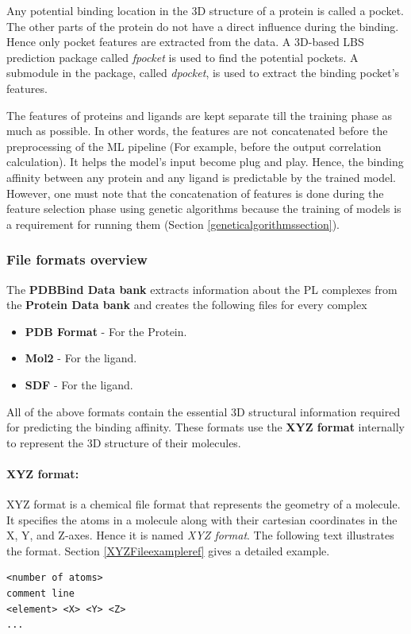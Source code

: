 \documentclass[11pt]{article}
\begin{document}
Any potential binding location in the 3D structure of a protein is called a pocket. The other parts of the protein do not have a direct influence during the binding. Hence only pocket features are extracted from the data.
A 3D-based LBS prediction package called \textit{fpocket} is used to find the potential pockets.
A submodule in the package, called \textit{dpocket}, is used to extract the binding pocket's features.

The features of proteins and ligands are kept separate till the training phase as much as possible.
In other words, the features are not concatenated before the preprocessing of the ML pipeline (For example, before the output correlation calculation).
It helps the model's input become plug and play.
Hence, the binding affinity between any protein and any ligand is predictable by the trained model.
However, one must note that the concatenation of features is done during the feature selection phase using genetic algorithms because the training of models is a requirement for running them (Section \ref{geneticalgorithmssection}).



\subsubsection{File formats overview}
The \textbf{PDBBind Data bank} extracts information about the PL complexes from the \textbf{Protein Data bank} and creates the following files for every complex
\begin{itemize}
\item \textbf{PDB Format} - For the Protein.
\item  \textbf{Mol2} - For the ligand.
\item \textbf{SDF} - For the ligand.
\end{itemize}

All of the above formats contain the essential 3D structural information required for predicting the binding affinity.
These formats use the \textbf{XYZ format} internally to represent the 3D structure of their molecules.

\paragraph{XYZ format:}
\label{xyz_format}
XYZ format is a chemical file format that represents the geometry of a molecule.
It specifies the atoms in a molecule along with their cartesian coordinates in the X, Y, and Z-axes.
Hence it is named \textit{XYZ format}.
The following text illustrates the format.
Section \ref{XYZFileexampleref} gives a detailed example.
\cite{XYZ_format}
\begin{verbatim}
<number of atoms>
comment line
<element> <X> <Y> <Z>
...
\end{verbatim}
\end{document}
